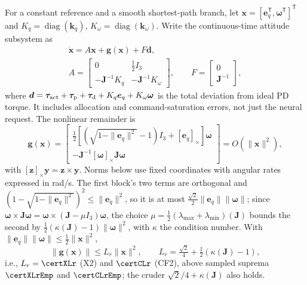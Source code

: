 \documentclass[letterpaper, 10 pt, conference]{ieeeconf}
\newcommand{\T}{^{\mathsf T}}
\begin{document}
For a constant reference and a smooth shortest-path branch, let
$\bm x=[\bm e_q\T,\bm\omega\T]\T$ and
$K_q=\operatorname{diag}(\bm k_q)$, $K_\omega=\operatorname{diag}(\bm k_\omega)$.
Write the continuous-time attitude subsystem as
\begin{equation}
 \begin{gathered}
 \dot{\bm x}=A\bm x+\bm g(\bm x)+F\bm d,\\
 A=\begin{bmatrix}0&\frac12I_3\\-\bm J^{-1}K_q&-\bm J^{-1}K_\omega\end{bmatrix},
 \qquad F=\begin{bmatrix}0\\\bm J^{-1}\end{bmatrix},
 \end{gathered}
 \label{eq:localmodel}
\end{equation}
where $\bm d=\bm\tau_{\rm act}+\bm\tau_{\rm p}+\bm\tau_{\rm d}
 +K_q\bm e_q+K_\omega\bm\omega$ is the total deviation from ideal PD torque.
It includes allocation and command-saturation errors, not just the neural
request. The nonlinear remainder is
\begin{equation}
 \bm g(\bm x)=\begin{bmatrix}
 \tfrac12[(\sqrt{1-\|\bm e_q\|^2}-1)I_3+[\bm e_q]_\times]\bm\omega\\
 -\bm J^{-1}[\bm\omega]_\times\bm J\bm\omega
 \end{bmatrix}=O(\|\bm x\|^2),
 \label{eq:localremainder}
\end{equation}
with $[\bm z]_\times\bm y=\bm z\times\bm y$. Norms below use fixed
coordinates with angular rates expressed in rad/s. The first block's two
terms are orthogonal and $(1-\sqrt{1-\|\bm e_q\|^2})^2\le\|\bm e_q\|^2$, so
it is at most $\frac{\sqrt2}{2}\|\bm e_q\|\|\bm\omega\|$; since
$\bm\omega\times\bm J\bm\omega=\bm\omega\times(\bm J-\mu I_3)\bm\omega$, the
choice $\mu=\frac12(\lambda_{\max}+\lambda_{\min})(\bm J)$ bounds the second
by $\frac12(\kappa(\bm J)-1)\|\bm\omega\|^2$, with $\kappa$ the condition
number. With $\|\bm e_q\|\|\bm\omega\|\le\frac12\|\bm x\|^2$,
\begin{equation}
 \|\bm g(\bm x)\|\le L_r\|\bm x\|^2,\qquad
 L_r=\tfrac{\sqrt2}{4}+\tfrac12(\kappa(\bm J)-1),
 \label{eq:Lr}
\end{equation}
i.e., $L_r=\certXLr$ (X2) and $\certCLr$ (CF2), above sampled suprema
$\certXLrEmp$ and $\certCLrEmp$; the cruder $\sqrt2/4+\kappa(\bm J)$ also holds.
\end{document}
